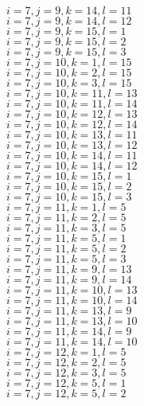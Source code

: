 \documentclass[14pt]{article}
\begin{document}
    $i=7,j=9,k=14,l=11 $ \\ 
    $i=7,j=9,k=14,l=12 $ \\ 
    $i=7,j=9,k=15,l=1 $ \\ 
    $i=7,j=9,k=15,l=2 $ \\ 
    $i=7,j=9,k=15,l=3 $ \\ 
    $i=7,j=10,k=1,l=15 $ \\ 
    $i=7,j=10,k=2,l=15 $ \\ 
    $i=7,j=10,k=3,l=15 $ \\ 
    $i=7,j=10,k=11,l=13 $ \\ 
    $i=7,j=10,k=11,l=14 $ \\ 
    $i=7,j=10,k=12,l=13 $ \\ 
    $i=7,j=10,k=12,l=14 $ \\ 
    $i=7,j=10,k=13,l=11 $ \\ 
    $i=7,j=10,k=13,l=12 $ \\ 
    $i=7,j=10,k=14,l=11 $ \\ 
    $i=7,j=10,k=14,l=12 $ \\ 
    $i=7,j=10,k=15,l=1 $ \\ 
    $i=7,j=10,k=15,l=2 $ \\ 
    $i=7,j=10,k=15,l=3 $ \\ 
    $i=7,j=11,k=1,l=5 $ \\ 
    $i=7,j=11,k=2,l=5 $ \\ 
    $i=7,j=11,k=3,l=5 $ \\ 
    $i=7,j=11,k=5,l=1 $ \\ 
    $i=7,j=11,k=5,l=2 $ \\ 
    $i=7,j=11,k=5,l=3 $ \\ 
    $i=7,j=11,k=9,l=13 $ \\ 
    $i=7,j=11,k=9,l=14 $ \\ 
    $i=7,j=11,k=10,l=13 $ \\ 
    $i=7,j=11,k=10,l=14 $ \\ 
    $i=7,j=11,k=13,l=9 $ \\ 
    $i=7,j=11,k=13,l=10 $ \\ 
    $i=7,j=11,k=14,l=9 $ \\ 
    $i=7,j=11,k=14,l=10 $ \\ 
    $i=7,j=12,k=1,l=5 $ \\ 
    $i=7,j=12,k=2,l=5 $ \\ 
    $i=7,j=12,k=3,l=5 $ \\ 
    $i=7,j=12,k=5,l=1 $ \\ 
    $i=7,j=12,k=5,l=2 $ \\ 
\end{document}
